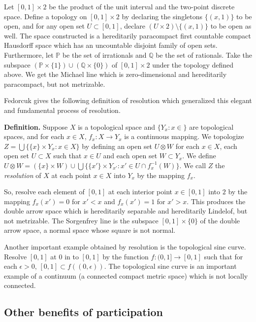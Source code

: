   Let \([0, 1]\times 2\) be the product of the unit interval and the two-point
  discrete space. Define a topology on \([0, 1]\times 2\)
  \cite{MR1512425} by declaring the singletons
  \(\{(x, 1)\}\) to be open, and for any open set \(U \subset [0, 1]\), declare
  \((U\times 2)\setminus \{(x, 1)\}\) to be open as well. The space constructed
  is a hereditarily paracompact first countable compact Hausdorff space which
  has an uncountable disjoint family of open sets.
  Furthermore, let \(\mathbb{P}\) be the
  set of irrationals and \(\mathbb{Q}\) be the set of rationals. Take the
  subspace \((\mathbb{P}\times \{1\}) \cup (\mathbb{Q}\times \{0\})\) of
  \([0, 1]\times 2\) under the topology defined above. We get the Michael
  line which is zero-dimensional and hereditarily paracompact, but not
  metrizable.

  Fedorcuk gives the following definition of resolution which generalized this
  elegant and fundamental process of resolution.

  \textbf{Definition.} Suppose \(X\) is a topological space and
  \(\{Y_x: x\in \}\) are topological spaces, and for each \(x\in X\),
  \(f_x: X\rightarrow Y_x\) is a continuous mapping. We topologize
  \(Z=\bigcup \{\{x\}\times Y_x: x\in X\}\) by defining an open set
  \(U\otimes W\) for each \(x\in X\), each open set \(U\subset X\) such
  that \(x\in U\) and each open set  \(W\subset Y_x\). We define
  \(
    U\otimes W=(\{x\}\times W)
      \cup
    \bigcup \{\{x'\}\times Y_{x'}: x'\in U\cap f_{x}^{-1}(W)\}
  \).
  We call \(Z\) the \textit{resolution} of \(X\) at each point \(x\in X\)
  into \(Y_x\) by the mapping \(f_x\).

  So, resolve each element of \([0,1]\) at each interior point \(x\in [0, 1]\)
  into \(2\) by the mapping \(f_x(x')=0\) for \(x'<x\) and
  \(f_x(x')=1\) for \(x'>x\). This produces the double arrow space which is
  hereditarily separable and hereditarily Lindelof, but not metrizable.
  The Sorgenfrey line is the subspace \([0, 1]\times \{0\}\) of the double
  arrow space, a normal space whose square is not normal.

  Another important example obtained by resolution is the topological sine curve.
  Resolve \([0, 1]\) at \(0\) in to \([0, 1]\) by the function
  \(f: (0, 1]\rightarrow [0, 1]\) such that for each
  \(\epsilon >0\), \([0, 1]\subset f((0, \epsilon))\). The topological sine curve
  is an important example of a continuum (a connected compact metric space) which
  is not locally connected.

  \subsection{Other benefits of participation}

